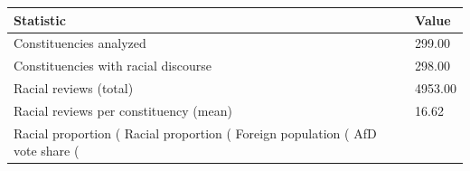 \begin{tabular}{ll}
\toprule
Statistic & Value \\
\midrule
Constituencies analyzed & 299.00 \\
Constituencies with racial discourse & 298.00 \\
Racial reviews (total) & 4953.00 \\
Racial reviews per constituency (mean) & 16.62 \\
Racial proportion (%
Racial proportion (%
Foreign population (%
AfD vote share (%
\bottomrule
\end{tabular}
